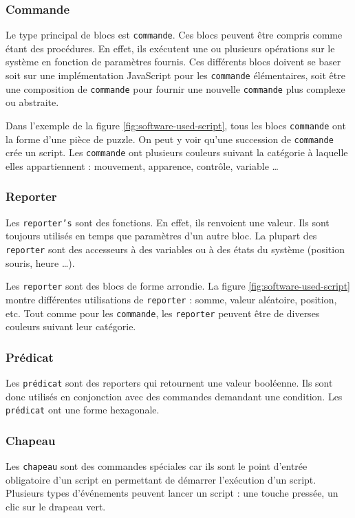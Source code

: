 \subsubsection{Commande}
Le type principal de blocs est \texttt{commande}. Ces blocs peuvent être compris comme étant des procédures. En effet, ils exécutent une ou plusieurs opérations sur le système en fonction de paramètres fournis. Ces différents blocs doivent se baser soit sur une implémentation JavaScript pour les \texttt{commande} élémentaires, soit être une composition de \texttt{commande} pour fournir une nouvelle \texttt{commande} plus complexe ou abstraite.

Dans l'exemple de la figure \ref{fig:software-used-script}, tous les blocs \texttt{commande} ont la forme d'une pièce de puzzle. On peut y voir qu'une succession de \texttt{commande} crée un script. Les \texttt{commande} ont plusieurs couleurs suivant la catégorie à laquelle elles appartiennent : mouvement, apparence, contrôle, variable \ldots

\subsubsection{Reporter}
Les \texttt{reporter's} sont des fonctions. En effet, ils renvoient une valeur. Ils sont toujours utilisés en temps que paramètres d'un autre bloc. La plupart des \texttt{reporter} sont des accesseurs à des variables ou à des états du système (position souris, heure \ldots). 

Les \texttt{reporter} sont des blocs de forme arrondie. La figure \ref{fig:software-used-script} montre différentes utilisations de \texttt{reporter} : somme, valeur aléatoire, position, etc. Tout comme pour les \texttt{commande}, les \texttt{reporter} peuvent être de diverses couleurs suivant leur catégorie.

\subsubsection{Prédicat}
Les \texttt{prédicat} sont des reporters qui retournent une valeur booléenne. Ils sont donc utilisés en conjonction avec des commandes demandant une condition. Les \texttt{prédicat} ont une forme hexagonale.

\subsubsection{Chapeau}
Les \texttt{chapeau} sont des commandes spéciales car ils sont le point d'entrée obligatoire d'un script en permettant de démarrer l'exécution d'un script. Plusieurs types d'événements peuvent lancer un script : une touche pressée, un clic sur le drapeau vert.

